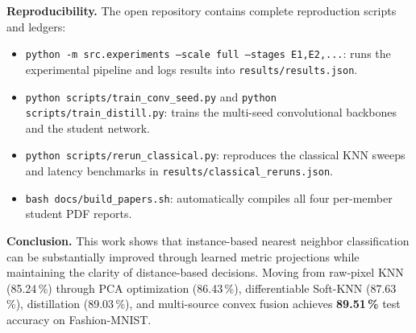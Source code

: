 \documentclass[10pt,a4paper]{article}
\newcommand{\file}[1]{\nolinkurl{#1}}
\begin{document}
\textbf{Reproducibility.} The open repository contains complete reproduction scripts and ledgers:
\begin{itemize}[leftmargin=1.4em]
\item \texttt{python -m src.experiments --scale full --stages E1,E2,...}: runs the experimental pipeline and logs results into \file{results/results.json}.
\item \texttt{python scripts/train\_conv\_seed.py} and \texttt{python scripts/train\_distill.py}: trains the multi-seed convolutional backbones and the student network.
\item \texttt{python scripts/rerun\_classical.py}: reproduces the classical KNN sweeps and latency benchmarks in \file{results/classical_reruns.json}.
\item \texttt{bash docs/build\_papers.sh}: automatically compiles all four per-member student PDF reports.
\end{itemize}

\textbf{Conclusion.} This work shows that instance-based nearest neighbor classification can be substantially improved through learned metric projections while maintaining the clarity of distance-based decisions. Moving from raw-pixel KNN (85.24\,\%) through PCA optimization (86.43\,\%), differentiable Soft-KNN (87.63\,\%), distillation (89.03\,\%), and multi-source convex fusion achieves \textbf{89.51\,\%} test accuracy on Fashion-MNIST.
\end{document}
